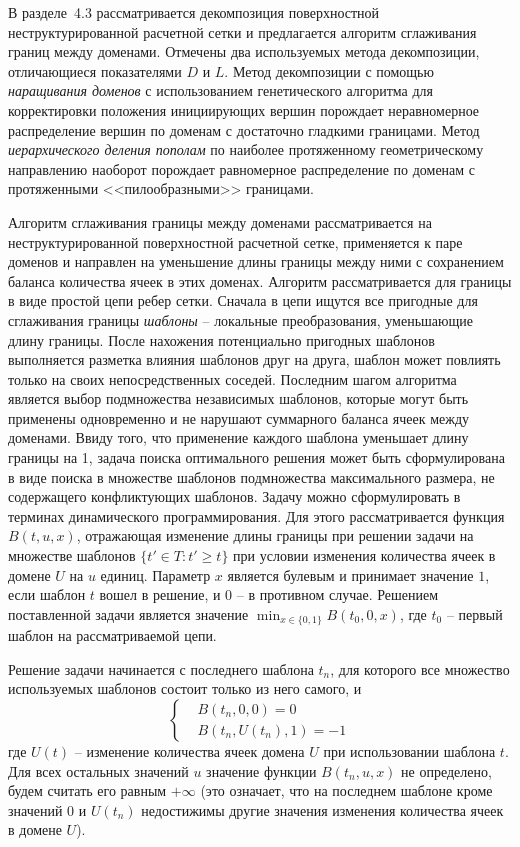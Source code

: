 \documentclass[a4paper,14pt]{extarticle}                     %
\theoremstyle{plain}                                         %
\begin{document}

В разделе~4.3 рассматривается декомпозиция поверхностной неструктурированной расчетной сетки и предлагается алгоритм сглаживания границ между доменами.
Отмечены два используемых метода декомпозиции, отличающиеся показателями $D$ и $L$.
Метод декомпозиции с помощью \textit{наращивания доменов} с использованием генетического алгоритма для корректировки положения инициирующих вершин порождает неравномерное распределение вершин по доменам с достаточно гладкими границами.
Метод \textit{иерархического деления пополам} по наиболее протяженному геометрическому направлению наоборот порождает равномерное распределение по доменам с протяженными <<пилообразными>> границами.

Алгоритм сглаживания границы между доменами рассматривается на неструктурированной поверхностной расчетной сетке, применяется к паре доменов и направлен на уменьшение длины границы между ними с сохранением баланса количества ячеек в этих доменах.
Алгоритм рассматривается для границы в виде простой цепи ребер сетки.
Сначала в цепи ищутся все пригодные для сглаживания границы \textit{шаблоны} -- локальные преобразования, уменьшающие длину границы.
После нахожения потенциально пригодных шаблонов выполняется разметка влияния шаблонов друг на друга, шаблон может повлиять только на своих непосредственных соседей.
Последним шагом алгоритма является выбор подмножества независимых шаблонов, которые могут быть применены одновременно и не нарушают суммарного баланса ячеек между доменами.
Ввиду того, что применение каждого шаблона уменьшает длину границы на 1, задача поиска оптимального решения может быть сформулирована в виде поиска в множестве шаблонов подмножества максимального размера, не содержащего конфликтующих шаблонов.
Задачу можно сформулировать в терминах динамического программирования.
Для этого рассматривается функция $B(t, u, x)$, отражающая изменение длины границы при решении задачи на множестве шаблонов $\{ t' \in T : t' \ge t \}$ при условии изменения количества ячеек в домене $U$ на $u$ единиц.
Параметр $x$ является булевым и принимает значение $1$, если шаблон $t$ вошел в решение, и $0$ -- в противном случае.
Решением поставленной задачи является значение $\min_{x \in \{0, 1\}}{B(t_0, 0, x)}$, где $t_0$ -- первый шаблон на рассматриваемой цепи.

Решение задачи начинается с последнего шаблона $t_n$, для которого все множество используемых шаблонов состоит только из него самого, и
\begin{equation*}
	\left\{
		\begin{aligned}
			& B(t_n, 0, 0) = 0 \\
			& B(t_n, U(t_n), 1) = -1
		\end{aligned}
	\right.
\end{equation*}
где $U(t)$ -- изменение количества ячеек домена $U$ при использовании шаблона $t$.
Для всех остальных значений $u$ значение функции $B(t_n, u, x)$ не определено, будем считать его равным $+\infty$ (это означает, что на последнем шаблоне кроме значений $0$ и $U(t_n)$ недостижимы другие значения изменения количества ячеек в домене $U$).
\end{document}
